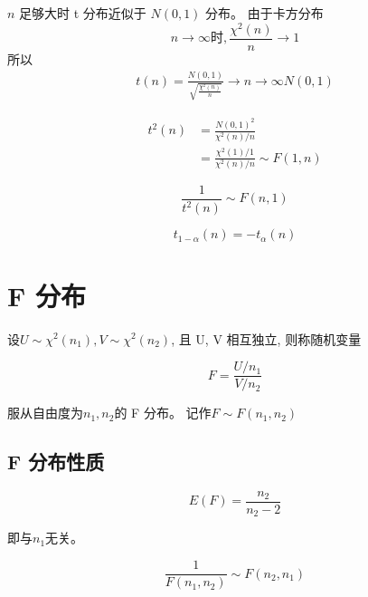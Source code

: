 \begin{corollary}
    $n$ 足够大时 t 分布近似于 $N(0,1)$ 分布。 由于卡方分布
    $$
        n\to \infty 时, \frac{\chi^2(n)}{n} \to 1
    $$
    所以
    $$
        \begin{aligned}
            t(n) =
            {\frac{N(0,1)}{\sqrt{\frac{\chi^2(n)}{n}}}
            \rightarrow{n \to \infty}
            N(0,1)}
        \end{aligned}
    $$
\end{corollary}

\begin{corollary}[与 F 分布的关系]
    $$
        \begin{aligned}
            t^2(n) & = \frac{N(0,1)^2}{\chi^2 (n)/n}                    \\
                   & = \frac{\chi ^2(1)/1}{ \chi ^2(n) / n} \sim F(1,n)
        \end{aligned}
    $$

    $$
        \frac{1}{t^2(n)} \sim F(n,1)
    $$
\end{corollary}

\begin{definition}[t 分布的上分位点]
    $$
        t_{1-\alpha} (n) = -t_\alpha(n)
    $$
\end{definition}

\section{F 分布}

\begin{definition}[F 分布]
    设$U \sim \chi^2(n_1), V \sim \chi^2(n_2)$, 且 U, V 相互独立, 则称随机变量

    $$
        F = \frac{U/n_1}{V/n_2}
    $$

    服从自由度为$n_1,n_2$的 F 分布。 记作$F \sim F(n_1,n_2)$
\end{definition}

\subsection{F 分布性质}

\begin{corollary}[F 分布数学期望]
    $$
        E(F) =\frac{{ n_2} }{{ n_2}  - 2}
    $$

    即与$n_1$无关。
\end{corollary}

\begin{corollary}[$F(n_1,n_2),F(n_2,n_1)$的关系]
    $$
        \frac{1}{F(n_1,n_2)} \sim F(n_2,n_1)
    $$
\end{corollary}


